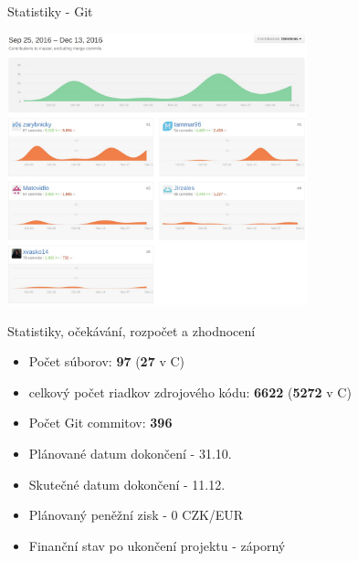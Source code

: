 \documentclass[13pt]{beamer}
\begin{document}
\begin{frame}{Statistiky - Git}
  \begin{center}
    \includegraphics[width=0.65\textwidth]{./img/git_del.pdf}
  \end{center}
\end{frame}

\begin{frame}{Statistiky, očekávání, rozpočet a zhodnocení}
\begin{itemize}
\item Počet súborov: \textbf{97} (\textbf{27} v C)
\item celkový počet riadkov zdrojového kódu: \textbf{6622} (\textbf{5272} v C)
\item Počet Git commitov: \textbf{396}
\end{itemize}

\begin{itemize}
\item Plánované datum dokončení - 31.10.
\item Skutečné datum dokončení - 11.12.
\item Plánovaný peněžní zisk - 0 CZK/EUR
\item Finanční stav po ukončení projektu - záporný
\end{itemize}

\end{frame}
\end{document}
